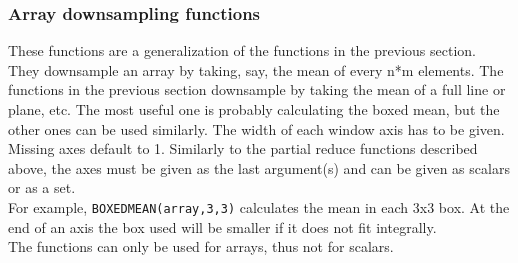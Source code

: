 \subsubsection{Array downsampling functions}
These functions are a generalization of the functions in the previous
section. They downsample an array by taking, say, the mean of every
n*m elements. The functions in the previous section downsample by
taking the mean of a full line or plane, etc.
The most useful one is probably calculating the boxed mean, but
the other ones can be used similarly.
The width of each window axis has to be given. Missing axes default to 1.
Similarly to the partial reduce functions described above, the axes
must be given as the last argument(s) and can be given as scalars or as a set.
\\For example,
\texttt{BOXEDMEAN(array,3,3)} calculates the mean
in each 3x3 box. At the end of an axis the box used will be smaller
if it does not fit integrally.
\\The functions can only be used for arrays, thus not for scalars.
